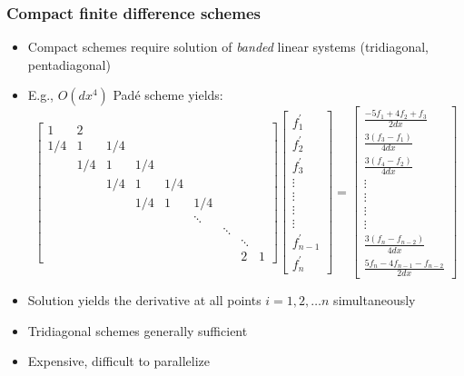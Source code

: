 \begin{frame}[t]
\frametitle{Compact finite difference schemes}
\footnotesize
\begin{itemize}
\item Compact schemes require solution of \emph{banded}
    linear systems (tridiagonal, pentadiagonal)
\item E.g., {$O(dx^4)$ Pad\'{e} scheme yields:
\footnotesize
\begin{equation*}
\begin{bmatrix}
     1&2\\
     1/4&1&1/4\\
     &1/4&1&1/4\\
     &&1/4&1&1/4\\
     &&&1/4&1&1/4\\
     &&&&&\ddots\\
     &&&&&&\ddots\\
     &&&&&&&\ddots\\
     &&&&&&&2&1
  \end{bmatrix}
  \boxed{
  \begin{bmatrix}
      f^{\prime}_1 \\
      f^{\prime}_2 \\
      f^{\prime}_3 \\
      \vdots \\
      \vdots \\
      \vdots \\
      \vdots \\
      f^{\prime}_{n-1} \\
      f^{\prime}_n
   \end{bmatrix}
   }
 =
 \begin{bmatrix}
     \frac{-5f_1 + 4f_2 + f_3}{2dx}\\
     \frac{3(f_{3} - f_{1})}{4dx}\\
     \frac{3(f_{4} - f_{2})}{4dx}\\
     \vdots\\
     \vdots\\
     \vdots\\
     \vdots\\
     \frac{3(f_{n} - f_{n-2})}{4dx}\\
     \frac{5f_{n} - 4f_{n-1} - f_{n-2}}{2dx}
  \end{bmatrix}
\end{equation*}}
\item Solution yields the derivative at
    all points $i=1, 2, \hdots n$ simultaneously
\item Tridiagonal schemes generally sufficient
\item Expensive, difficult to parallelize
\end{itemize}
\end{frame}

